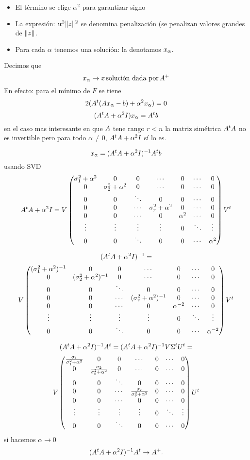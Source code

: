 \begin{itemize}
 \item  El término se elige $\alpha^2$ para garantizar signo
\item La expresión: $\alpha^2\|\zb\|^2$ se denomina penalización (se penalizan valores grandes de  $\|\zb\|$.
\item Para cada $\alpha$ tenemos una solución: la denotamos $\xb_\alpha$.
 \end{itemize}
 Decimos que
 $$
 \xb_\alpha\to \xb \, \mbox{solución dada por}\, \Ab^+
 $$
 En efecto: para el mínimo de $F$ se tiene
 $$
 2(\Ab^t(\Ab\xb_\alpha-\bb)+\alpha^2\xb_\alpha)=\cero
 $$
 $$
 (\Ab^t\Ab+\alpha^2 \Ib) \xb_\alpha=\Ab^t\bb
 $$
 en el caso mas interesante en que $\Ab$ tene rango $r<n$ la matriz simétrica $\Ab^t\Ab$
 no es invertible pero para todo $\alpha\neq 0$, $\Ab^t\Ab+\alpha^2 \Ib$ sí lo es.

 $$
 \xb_\alpha= (\Ab^t\Ab+\alpha^2 \Ib)^{-1}\Ab^t\bb
 $$
usando SVD
$$
\Ab^t\Ab+\alpha^2 \Ib=\Vb \begin{pmatrix}
\sigma_1^2+\alpha^2&0&0&\cdots &0&\cdots &0\\
0&\sigma_2^2+\alpha^2&0&\cdots &0&\cdots &0\\
0&0&\ddots&0&0&\cdots &0\\
0&0&\cdots&\sigma_r^2+\alpha^2&0&\cdots &0\\
0&0&\cdots&0&\alpha^2&\cdots &0\\
\vdots&\vdots&\vdots&\vdots&0&\ddots&\vdots\\
0&0&\ddots&0&0&\cdots &\alpha^2
\end{pmatrix} \Vb^t
$$

$$
(\Ab^t\Ab+\alpha^2 \Ib)^{-1}=$$
$$\Vb \begin{pmatrix}
(\sigma_1^2+\alpha^2)^{-1}&0&0&\cdots &0&\cdots &0\\
0&(\sigma_2^2+\alpha^2)^{-1}&0&\cdots &0&\cdots &0\\
0&0&\ddots&0&0&\cdots &0\\
0&0&\cdots&(\sigma_r^2+\alpha^2)^{-1}&0&\cdots &0\\
0&0&\cdots&0&\alpha^{-2}&\cdots &0\\
\vdots&\vdots&\vdots&\vdots&0&\ddots&\vdots\\
0&0&\ddots&0&0&\cdots &\alpha^{-2}
\end{pmatrix} \Vb^t
$$


$$
(\Ab^t\Ab+\alpha^2 \Ib)^{-1}\Ab^t=(\Ab^t\Ab+\alpha^2 \Ib)^{-1}\Vb\Sigma^t\Ub^t=
$$
$$\Vb \begin{pmatrix}
\frac{\sigma_1}{\sigma_1^2+\alpha^2}&0&0&\cdots &0&\cdots &0\\
0&\frac{\sigma_2}{\sigma_2^2+\alpha^2}&0&\cdots &0&\cdots &0\\
0&0&\ddots&0&0&\cdots &0\\
0&0&\cdots&\frac{\sigma_r}{\sigma_r^2+\alpha^2}&0&\cdots &0\\
0&0&\cdots&0&0&\cdots &0\\
\vdots&\vdots&\vdots&\vdots&0&\ddots&\vdots\\
0&0&\ddots&0&0&\cdots &0
\end{pmatrix} \Ub^t
$$
 si hacemos $\alpha\to 0$
 $$
 (\Ab^t\Ab+\alpha^2 \Ib)^{-1}\Ab^t \to \Ab^+.
 $$




